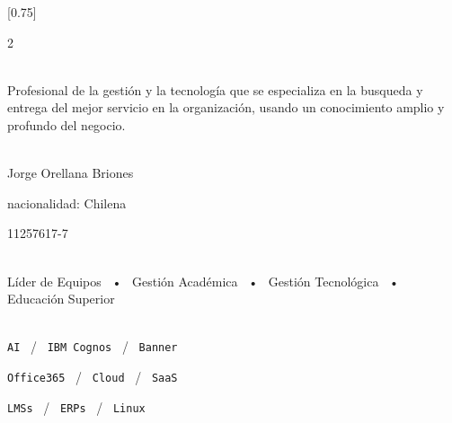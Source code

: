 \documentclass[lighthipster]{simplehipstercv}
\begin{document}
\setlength{\columnsep}{1.5cm}
[0.75]
\begin{paracol}{2}

\paracolbackgroundoptions



\footnotesize
{\setasidefontcolour
\flushright
\begin{center}
\end{center}

\\[0.5em]

{\footnotesize
Profesional de la gestión y la tecnología que se
especializa en la busqueda y 
entrega del mejor
servicio en la organización, usando un conocimiento
amplio y profundo del negocio.}
\bigskip

 \\[0.5em]
Jorge Orellana Briones

nacionalidad: Chilena 

11257617-7

\bigskip

 \\[0.5em]

Líder de Equipos ~•~ Gestión Académica ~•~  Gestión Tecnológica ~•~ Educación Superior







\bigskip

\\[0.5em]

\texttt{AI} ~/~ \texttt{IBM Cognos} ~/~ \texttt{Banner}

\texttt{Office365} ~/~ \texttt{Cloud} ~/~ \texttt{SaaS}

\texttt{LMSs} ~/~ \texttt{ERPs} ~/~ \texttt{Linux}

\vspace{4em}


}
\end{paracol}
\end{document}
